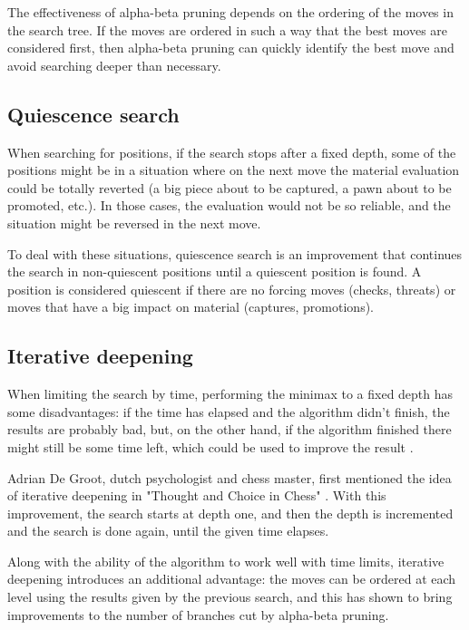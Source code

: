 The effectiveness of alpha-beta pruning depends on the ordering of the moves in the search tree. If the moves are ordered in such a way that the best moves are considered first, then alpha-beta pruning can quickly identify the best move and avoid searching deeper than necessary.

\subsection{Quiescence search}
\label{subsec:ch2sec2subsec3}

When searching for positions, if the search stops after a fixed depth, some of the positions might be in a situation where on the next move the material evaluation could be totally reverted (a big piece about to be captured, a pawn about to be promoted, etc.). In those cases, the evaluation would not be so reliable, and the situation might be reversed in the next move.

To deal with these situations, quiescence search is an improvement that continues the search in non-quiescent positions until a quiescent position is found. A position is considered quiescent if there are no forcing moves (checks, threats) or moves that have a big impact on material (captures, promotions).

\subsection{Iterative deepening}
\label{subsec:ch2sec1subsec4}

When limiting the search by time, performing the minimax to a fixed depth has some disadvantages: if the time has elapsed and the algorithm didn't finish, the results are probably bad, but, on the other hand, if the algorithm finished there might still be some time left, which could be used to improve the result \cite{carolus2006alpha}.

Adrian De Groot, dutch psychologist and chess master, first mentioned the idea of iterative deepening in "Thought and Choice in Chess" \cite{thought2014groot}. With this improvement, the search starts at depth one, and then the depth is incremented and the search is done again, until the given time elapses.

Along with the ability of the algorithm to work well with time limits, iterative deepening introduces an additional advantage: the moves can be ordered at each level using the results given by the previous search, and this has shown to bring improvements to the number of branches cut by alpha-beta pruning.

